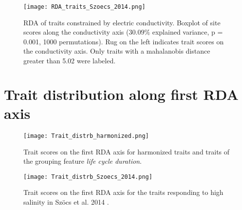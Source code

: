 \documentclass[../Draft_harmonization_paper.tex]{subfiles}
\begin{document}
\begin{figure}[H]
    \centering
    \texttt{[image: RDA\_traits\_Szoecs\_2014.png]}
    \caption{RDA of traits constrained by electric conductivity. Boxplot of site scores along the conductivity axis ($30.09 \%$ explained variance, p = 0.001, 1000 permutations). Rug on the left indicates trait scores on the conductivity axis. Only traits with a mahalanobis distance greater than 5.02 were labeled.
    } 
\end{figure}

\section*{Trait distribution along first RDA axis} 
\begin{figure}[H]
    \centering
    \texttt{[image: Trait\_distrb\_harmonized.png]}
    \caption{Trait scores on the first RDA axis for harmonized traits and traits of the grouping feature \textit{life cycle duration}.
    } 
\end{figure}

\begin{figure}[H]
    \centering
    \texttt{[image: Trait\_distrb\_Szoecs\_2014.png]}
    \caption{Trait scores on the first RDA axis for the traits responding to high salinity in Szöcs et al. 2014
    .
    }
\end{figure}

\newpage
\end{document}
